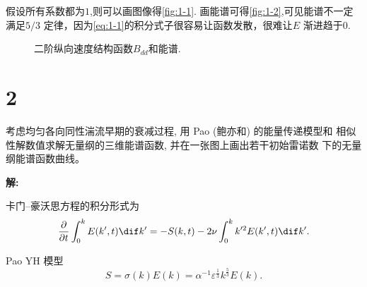 \documentclass[12pt,a4]{ctexart}
\begin{document}
假设所有系数都为$1$,则可以画图像得\cref{fig:1-1}.
画能谱可得\cref{fig:1-2},可见能谱不一定满足$5 / 3$ 定律，因为\cref{eq:1-1}的积分式子很容易让函数发散，很难让$E$ 渐进趋于$0$.
\begin{figure}[htpb]
   \centering
   \quad
   \quad
   \caption{二阶纵向速度结构函数$B_{d d}$和能谱.}
\end{figure}



\section{2}

考虑均匀各向同性湍流早期的衰减过程, 用 Pao (鲍亦和) 的能量传递模型和 相似性解数值求解无量纲的三维能谱函数, 并在一张图上画出若干初始雷诺数 下的无量纲能谱函数曲线。

\textsf{\hspace{-2em}\sf  \textbf{解:}}

卡门--豪沃思方程的积分形式为
\begin{equation}
   \frac{\partial }{\partial t}  \int_{0}^{k} E(k',t)\dif k' = -S(k,t) - 2\nu \int_{0}^{k} k'^2E(k',t)\dif k'.  
   \label{eq:2_1}
\end{equation}

Pao YH 模型 \cite{PaoYH}
\begin{equation}
   S=\sigma(k) E(k)=\alpha^{-1} \varepsilon^{\frac{1}{3}} k^{\frac{5}{3}} E(k).
\end{equation}
\end{document}
